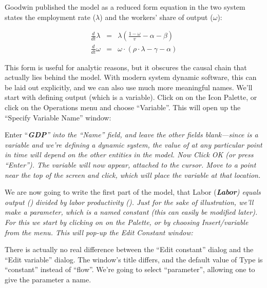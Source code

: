 \begin{itemize}
Goodwin published the model as a reduced form equation in the two
system states the employment rate ($\lambda$) and the workers' share
of output ($\omega$):

\begin{eqnarray*}
\frac{d}{dt}\lambda & = & \lambda\left(\frac{1-\omega}{v}-\alpha-\beta\right)\\
\frac{d}{dt}\omega & = & \omega\cdot\left(\rho\cdot\lambda-\gamma-\alpha\right)
\end{eqnarray*}

\end{itemize}
This form is useful for analytic reasons, but it obscures the causal
chain that actually lies behind the model. With modern system dynamic
software, this can be laid out explicitly, and we can also use much
more meaningful names. We'll start with defining output (which is
a variable). Click on  on the Icon Palette,
or click on the Operations menu and choose ``Variable''. This will
open up the ``Specify Variable Name'' window:
\begin{center}
\par\end{center}

Enter ``{\em\textbf{GDP}'' into the ``Name'' field, and leave
the other fields blank---since {\emGDP} is a variable and we're
defining a dynamic system, the value of {\emGDP} at any particular
point in time will depend on the other entities in the model. Now
Click OK (or press ``Enter''). The variable will now appear, attached
to the cursor. Move to a point near the top of the screen and click,
which will place the variable at that location.}

We are now going to write the first part of the model, that Labor
({\em\textbf{Labor}) equals output ({\emGDP}) divided by labor
productivity ({\emLabProd}). Just for the sake of illustration,
we'll make {\ema} a parameter, which is a named constant (this
can easily be modified later). For this we start by clicking on 
on the Palette, or by choosing Insert/variable from the menu. This
will pop-up the Edit Constant window:}
\begin{center}
\par\end{center}

There is actually no real difference between the ``Edit constant''
dialog and the ``Edit variable'' dialog. The window's title differs,
and the default value of Type is ``constant'' instead of ``flow''.
We're going to select ``parameter'', allowing one to give the parameter
a name.

